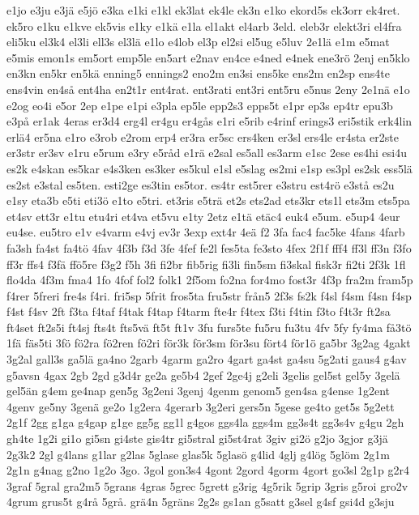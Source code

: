 {e1jo
e3ju
e3jä
e5jö
e3ka
e1ki
e1kl
ek3lat
ek4le
ek3n
e1ko
ekord5s
ek3orr
ek4ret.
ek5ro
e1ku
e1kve
ek5vis
e1ky
e1kä
e1la
el1akt
el4arb
3eld.
eleb3r
elekt3ri
el4fra
eli5ku
el3k4
el3li
ell3s
el3lä
e1lo
e4lob
el3p
el2si
el5ug
e5luv
2e1lä
e1m
e5mat
e5mis
emon1s
em5ort
emp5le
en5art
e2nav
en4ce
e4ned
e4nek
ene3rö
2enj
en5klo
en3kn
en5kr
en5kä
enning5
ennings2
eno2m
en3si
ens5ke
ens2m
en2sp
ens4te
ens4vin
en4så
ent4ha
en2t1r
ent4rat.
ent3rati
ent3ri
ent5ru
e5nus
2eny
2e1nä
e1o
e2og
eo4i
e5or
2ep
e1pe
e1pi
e3pla
ep5le
epp2s3
epps5t
e1pr
ep3s
ep4tr
epu3b
e3på
er1ak
4eras
er3d4
erg4l
er4gu
er4gås
e1ri
e5rib
e4rinf
erings3
eri5stik
erk4lin
erlä4
er5na
e1ro
e3rob
e2rom
erp4
er3ra
er5sc
ers4ken
er3sl
ers4le
er4sta
er2ste
er3str
er3sv
e1ru
e5rum
e3ry
e5råd
e1rä
e2sal
es5all
es3arm
e1sc
2ese
es4hi
esi4u
es2k
e4skan
es5kar
e4s3ken
es3ker
es5kul
e1sl
e5slag
es2mi
e1sp
es3pl
es2sk
ess5lä
es2st
e3stal
es5ten.
esti2ge
es3tin
es5tor.
es4tr
est5rer
e3stru
est4rö
e3stå
es2u
e1sy
eta3b
e5ti
eti3ö
e1to
e5tri.
et3ris
e5trä
et2s
ets2ad
ets3kr
ets1l
ets3m
ets5pa
et4sv
ett3r
e1tu
etu4ri
et4va
et5vu
e1ty
2etz
e1tä
etäc4
euk4
e5um.
e5up4
4eur
eu4se.
eu5tro
e1v
e4varm
e4vj
ev3r
3exp
ext4r
4eä
f2
3fa
fac4
fac5ke
4fans
4farb
fa3sh
fa4st
fa4tö
4fav
4f3b
f3d
3fe
4fef
fe2l
fes5ta
fe3sto
4fex
2f1f
fff4
ff3l
ff3n
f3fo
ff3r
ffs4
f3fä
ffö5re
f3g2
f5h
3fi
fi2br
fib5rig
fi3li
fin5sm
fi3skal
fisk3r
fi2ti
2f3k
1fl
flo4da
4f3m
fma4
1fo
4fof
fol2
folk1
2f5om
fo2na
for4mo
fost3r
4f3p
fra2m
fram5p
f4rer
5freri
fre4s
f4ri.
fri5sp
5frit
fros5ta
fru5str
från5
2f3s
fs2k
f4sl
f4sm
f4sn
f4sp
f4st
f4sv
2ft
f3ta
f4taf
f4tak
f4tap
f4tarm
fte4r
f4tex
f3ti
f4tin
f3to
f4t3r
ft2sa
ft4set
ft2s5i
ft4sj
fts4t
fts5vä
ft5t
ft1v
3fu
furs5te
fu5ru
fu3tu
4fv
5fy
fy4ma
få3tö
1fä
fäs5ti
3fö
fö2ra
fö2ren
fö2ri
för3k
för3sm
för3su
fört4
för1ö
ga5br
3g2ag
4gakt
3g2al
gall3s
ga5lä
ga4no
2garb
4garm
ga2ro
4gart
ga4st
ga4su
5g2ati
gaus4
g4av
g5avsn
4gax
2gb
2gd
g3d4r
ge2a
ge5b4
2gef
2ge4j
g2eli
3gelis
gel5st
gel5y
3gelä
gel5än
g4em
ge4nap
gen5g
3g2eni
3genj
4genm
genom5
gen4sa
g4ense
1g2ent
4genv
ge5ny
3genä
ge2o
1g2era
4gerarb
3g2eri
gers5n
5gese
ge4to
get5s
5g2ett
2g1f
2gg
g1ga
g4gap
g1ge
gg5g
gg1l
g4gos
ggs4la
ggs4m
gg3s4t
gg3s4v
g4gu
2gh
gh4te
1g2i
gi1o
gi5sn
gi4ste
gis4tr
gi5stral
gi5st4rat
3giv
gi2ö
g2jo
3gjor
g3jä
2g3k2
2gl
g4lans
g1lar
g2las
5glase
glas5k
5glasö
g4lid
4glj
g4lög
5glöm
2g1m
2g1n
g4nag
g2no
1g2o
3go.
3gol
gon3s4
4gont
2gord
4gorm
4gort
go3sl
2g1p
g2r4
3graf
5gral
gra2m5
5grans
4gras
5grec
5grett
g3rig
4g5rik
5grip
3gris
g5roi
gro2v
4grum
grus5t
g4rå
5grå.
grä4n
5gräns
2g2s
gs1an
g5satt
g3sel
g4sf
gsi4d
g3sju
}
